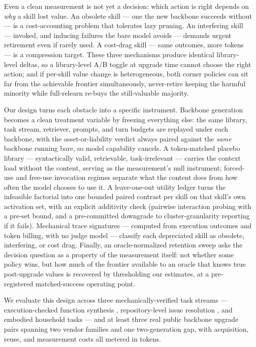 \documentclass[11pt]{article}
\begin{document}
Even a clean measurement is not yet a decision: which action is right depends on \emph{why} a skill lost value. An obsolete skill --- one the new backbone succeeds without --- is a cost-accounting problem that tolerates lazy pruning. An interfering skill --- invoked, and inducing failures the bare model avoids --- demands urgent retirement even if rarely used. A cost-drag skill --- same outcomes, more tokens --- is a compression target. These three mechanisms produce identical library-level deltas, so a library-level A/B toggle at upgrade time cannot choose the right action; and if per-skill value change is heterogeneous, both corner policies can sit far from the achievable frontier simultaneously, never-retire keeping the harmful minority while full-relearn re-buys the still-valuable majority.

Our design turns each obstacle into a specific instrument. Backbone generation becomes a clean treatment variable by freezing everything else: the same library, task stream, retriever, prompts, and turn budgets are replayed under each backbone, with the asset-or-liability verdict always paired against the \emph{same} backbone running bare, so model capability cancels. A token-matched placebo library --- syntactically valid, retrievable, task-irrelevant --- carries the context load without the content, serving as the measurement's null instrument; forced-use and free-use invocation regimes separate what the content does from how often the model chooses to use it. A leave-one-out utility ledger turns the infeasible factorial into one bounded paired contrast per skill on that skill's own activation set, with an explicit additivity check (pairwise interaction probing with a pre-set bound, and a pre-committed downgrade to cluster-granularity reporting if it fails). Mechanical trace signatures --- computed from execution outcomes and token billing, with no judge model --- classify each depreciated skill as obsolete, interfering, or cost drag. Finally, an oracle-normalized retention sweep asks the decision question as a property of the measurement itself: not whether some policy wins, but how much of the frontier available to an oracle that knows true post-upgrade values is recovered by thresholding our estimates, at a pre-registered matched-success operating point.

We evaluate this design across three mechanically-verified task streams --- execution-checked function synthesis \citep{MBPP2021,EvalPlus2023}, repository-level issue resolution \citep{SWEbench2024}, and embodied household tasks \citep{ALFWorld2021} --- and at least three real public backbone upgrade pairs spanning two vendor families and one two-generation gap, with acquisition, reuse, and measurement costs all metered in tokens.
\end{document}
